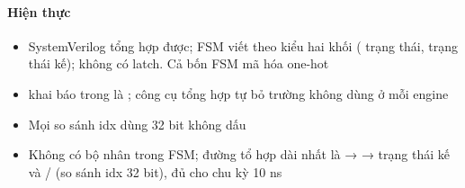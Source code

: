 \documentclass[10pt,a4paper]{article}
\begin{document}
\paragraph{Hiện thực}\label{par:10-2}
\begin{itemize}
\item SystemVerilog tổng hợp được; FSM viết theo kiểu hai khối ( trạng thái,  trạng thái kế); không có latch. Cả bốn FSM mã hóa one-hot
\item {} khai báo trong  là ; công cụ tổng hợp tự bỏ trường không dùng ở mỗi engine
\item Mọi so sánh idx dùng 32 bit không dấu
\item Không có bộ nhân trong FSM; đường tổ hợp dài nhất là  →  → trạng thái kế và / (so sánh idx 32 bit), đủ cho chu kỳ 10 ns
\end{itemize}
\end{document}
